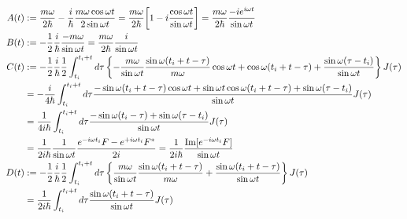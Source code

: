 \begin{subequations}
\begin{align}
    A(t)
    &:=
    \dfrac{m \omega}{2 \hbar}
    -
    \dfrac{i}{\hbar}
    \dfrac{m \omega \cos \omega t}{2 \sin \omega t}
=
    \dfrac{m \omega}{2 \hbar}
    \bigg[
        1
    -
        i
        \dfrac{\cos \omega t}{\sin \omega t}
    \bigg]
=
    \dfrac{m \omega}{2 \hbar}
    \dfrac{- i e^{i \omega t} }{\sin \omega t}
\\
    B(t)
    &:=
    -
    \dfrac{1}{2}
    \dfrac{i}{\hbar}
    \dfrac{- m \omega}{\sin \omega t}
    =
    \dfrac{m \omega}{2 \hbar}
    \dfrac{ i }{\sin \omega t}
\\
    C(t)
    &:=
    -
    \frac{1}{2}
    \dfrac{i}{\hbar}
    \dfrac{1}{2}
    \int_{t_i}^{t_i + t} d\tau
    \left\{
    -
        \dfrac{m \omega}{\sin \omega t}
            \dfrac{
                \sin \omega (t_i + t - \tau)
            }{m \omega}
        \cos \omega t
    +
        \cos \omega (t_i + t - \tau)
    +
        \dfrac{\sin \omega (\tau - t_i)}{\sin \omega t}
    \right\}
    J(\tau)
\notag\\&=
    -
    \dfrac{i}{4 \hbar}
    \int_{t_i}^{t_i + t} d\tau
    \dfrac{
    -
        \sin \omega (t_i + t - \tau)
        \cos \omega t
    +
        \sin \omega t
        \cos \omega (t_i + t - \tau)
    +
        \sin \omega (\tau - t_i)
    }{\sin \omega t}
    J(\tau)
\notag\\&=
    \dfrac{1}{4 i \hbar}
    \int_{t_i}^{t_i + t} d\tau
    \dfrac{
    -
        \sin \omega (t_i - \tau)
    +
        \sin \omega (\tau - t_i)
    }{\sin \omega t}
    J(\tau)
\notag\\&=
    \dfrac{1}{2 i \hbar}
    \dfrac{
        1
    }{\sin \omega t}
    \dfrac{
        e^{- i \omega t_i}
            F
        -
        e^{+ i \omega t_i}
            F^*
    }{ 2i }
=
    \dfrac{1}{2 i \hbar}
    \dfrac{
        \Im[ e^{- i \omega t_i}
            F ]
    }{\sin \omega t}
\\
    D(t)
    &:=
    -
    \dfrac{1}{2}
    \dfrac{i}{\hbar}
    \dfrac{1}{2}
    \int_{t_i}^{t_i + t} d \tau
    \left\{
        \dfrac{m \omega}{\sin \omega t}
        \dfrac{
            \sin \omega (t_i + t - \tau)
        }{m \omega}
    +
        \dfrac{
            \sin \omega (t_i + t - \tau)
        }{\sin \omega t}
    \right\}
    J(\tau)
\notag\\&=
    \dfrac{1}{2 i \hbar}
    \int_{t_i}^{t_i + t} d \tau
        \dfrac{
            \sin \omega (t_i + t - \tau)
        }{\sin \omega t}
    J(\tau)

\end{align}
\end{subequations}

